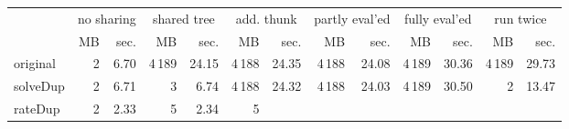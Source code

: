 \makeatletter
\begin{tabular}{lrrrrrrrrrrrr}
 \\
& \multicolumn{2}{c}{no sharing}& \multicolumn{2}{c}{shared tree}& \multicolumn{2}{c}{add. thunk}& \multicolumn{2}{c}{partly eval'ed}& \multicolumn{2}{c}{fully eval'ed}& \multicolumn{2}{c}{run twice} \\
& MB & sec.& MB & sec.& MB & sec.& MB & sec.& MB & sec.& MB & sec. \\ \midrule 
original%
&
 {\def\@currentlabel{2}\label{stats:Original:Unshared:mem}2} &
 {\def\@currentlabel{6.70}\label{stats:Original:Unshared:time}6.70}&
 {\def\@currentlabel{4\,189}\label{stats:Original:Shared:mem}4\,189} &
 {\def\@currentlabel{24.15}\label{stats:Original:Shared:time}24.15}&
 {\def\@currentlabel{4\,188}\label{stats:Original:SharedThunk:mem}4\,188} &
 {\def\@currentlabel{24.35}\label{stats:Original:SharedThunk:time}24.35}&
 {\def\@currentlabel{4\,188}\label{stats:Original:SharedEvaled:mem}4\,188} &
 {\def\@currentlabel{24.08}\label{stats:Original:SharedEvaled:time}24.08}&
 {\def\@currentlabel{4\,189}\label{stats:Original:SharedFull:mem}4\,189} &
 {\def\@currentlabel{30.36}\label{stats:Original:SharedFull:time}30.36}&
 {\def\@currentlabel{4\,189}\label{stats:Original:RunTwice:mem}4\,189} &
 {\def\@currentlabel{29.73}\label{stats:Original:RunTwice:time}29.73} \\
\textsf{solveDup}%
&
 {\def\@currentlabel{2}\label{stats:SolveDup:Unshared:mem}2} &
 {\def\@currentlabel{6.71}\label{stats:SolveDup:Unshared:time}6.71}&
 {\def\@currentlabel{3}\label{stats:SolveDup:Shared:mem}3} &
 {\def\@currentlabel{6.74}\label{stats:SolveDup:Shared:time}6.74}&
 {\def\@currentlabel{4\,188}\label{stats:SolveDup:SharedThunk:mem}4\,188} &
 {\def\@currentlabel{24.32}\label{stats:SolveDup:SharedThunk:time}24.32}&
 {\def\@currentlabel{4\,188}\label{stats:SolveDup:SharedEvaled:mem}4\,188} &
 {\def\@currentlabel{24.03}\label{stats:SolveDup:SharedEvaled:time}24.03}&
 {\def\@currentlabel{4\,189}\label{stats:SolveDup:SharedFull:mem}4\,189} &
 {\def\@currentlabel{30.50}\label{stats:SolveDup:SharedFull:time}30.50}&
 {\def\@currentlabel{2}\label{stats:SolveDup:RunTwice:mem}2} &
 {\def\@currentlabel{13.47}\label{stats:SolveDup:RunTwice:time}13.47} \\
\textsf{rateDup}%
&
 {\def\@currentlabel{2}\label{stats:RateDup:Unshared:mem}2} &
 {\def\@currentlabel{2.33}\label{stats:RateDup:Unshared:time}2.33}&
 {\def\@currentlabel{5}\label{stats:RateDup:Shared:mem}5} &
 {\def\@currentlabel{2.34}\label{stats:RateDup:Shared:time}2.34}&
 {\def\@currentlabel{5}\label{stats:RateDup:SharedThunk:mem}5} &

\end{tabular}

